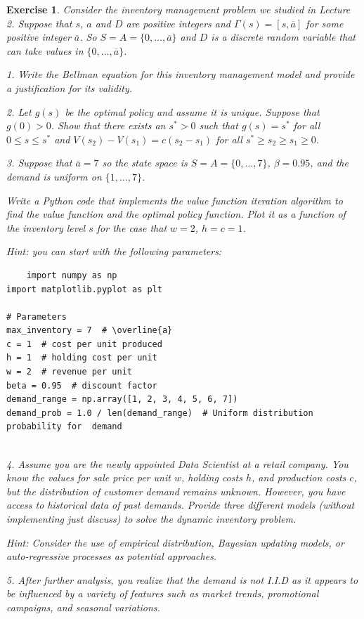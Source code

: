 \documentclass[letter,11pt]{article}
\newtheorem{exercise}{Exercise}[section]
\begin{document}
\begin{exercise}
Consider the inventory management problem we studied in Lecture 2. 
Suppose that $s$, $a$ and $D$ are positive integers and $\Gamma(s) = [s,\overline{a}]$ for some positive integer $\overline{a}$. So $S = A = \{0, \ldots , \overline{a} \}$ and $D$ is a discrete random variable that can take values in $\{0, \ldots , \overline{a} \}$. 

1. Write the Bellman equation for this inventory management model and provide a justification for its validity.

2. Let $g(s)$ be the optimal policy and assume it is unique. Suppose that  $g(0) > 0$.  Show that there exists an $s^{*} > 0$ such that $g(s) = s^{*}$ for all $0 \leq s \leq s^{*}$ and $V(s_{2})-V(s_{1}) = c(s_{2} - s_{1})$ for all $s^{*} \geq s_{2} \geq s_{1} \geq 0$. 


3. Suppose that $\overline{a}=7$ so the state space is $S=A=\{0,\ldots,7\}$, $\beta=0.95$, and the demand is uniform on $\{1,\ldots,7\}$. 

Write a Python code that implements the value function iteration algorithm to find the value function and the optimal policy function. Plot it as a function of the inventory level $s$ for the case that $w=2$, $h=c=1$.

Hint: you can start with the following parameters:  
\begin{verbatim}
    import numpy as np
import matplotlib.pyplot as plt

# Parameters
max_inventory = 7  # \overline{a}
c = 1  # cost per unit produced
h = 1  # holding cost per unit
w = 2  # revenue per unit
beta = 0.95  # discount factor
demand_range = np.array([1, 2, 3, 4, 5, 6, 7])
demand_prob = 1.0 / len(demand_range)  # Uniform distribution probability for  demand


\end{verbatim}


4. Assume you are the newly appointed Data Scientist at a retail company. You know the values for sale price per unit $w$, holding costs $h$, 
 and production costs $c$, but the distribution of customer demand remains unknown. However, you have access to historical data of past demands. Provide three different models (without implementing just discuss) to solve the dynamic inventory problem. 

Hint: Consider the use of empirical distribution, Bayesian updating models, or auto-regressive processes as potential approaches.

5. After further analysis, you realize that the demand is not I.I.D as it appears to be influenced by a variety of features such as market trends, promotional campaigns, and seasonal variations.


\end{exercise}
\end{document}
